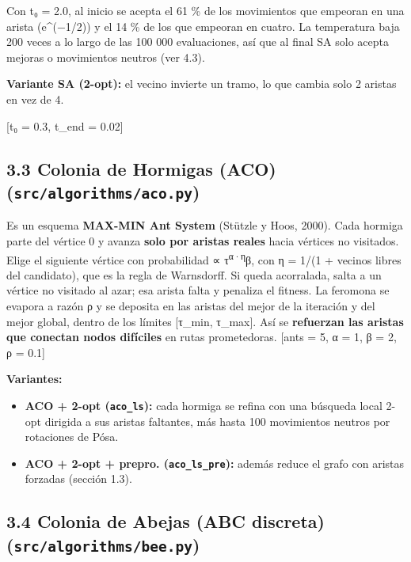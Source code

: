 \documentclass[
  spanish,
  11pt,
]{article}
\providecommand{\tightlist}{%
  \setlength{\itemsep}{0pt}\setlength{\parskip}{0pt}}
\begin{document}
Con t₀ = 2.0, al inicio se acepta el 61 \% de los movimientos que
empeoran en una arista (e\^{}(−1/2)) y el 14 \% de los que empeoran en
cuatro. La temperatura baja 200 veces a lo largo de las 100 000
evaluaciones, así que al final SA solo acepta mejoras o movimientos
neutros (ver 4.3).

\textbf{Variante SA (2-opt):} el vecino invierte un tramo, lo que cambia
solo 2 aristas en vez de 4.

{[}t₀ = 0.3, t\_end = 0.02{]}

\subsection{\texorpdfstring{3.3 Colonia de Hormigas (ACO)
(\texttt{src/algorithms/aco.py})}{3.3 Colonia de Hormigas (ACO) (src/algorithms/aco.py)}}\label{colonia-de-hormigas-aco-srcalgorithmsaco.py}

Es un esquema \textbf{MAX-MIN Ant System} (Stützle y Hoos, 2000). Cada
hormiga parte del vértice 0 y avanza \textbf{solo por aristas reales}
hacia vértices no visitados. Elige el siguiente vértice con probabilidad
∝ τ\textsuperscript{α·η}β, con η = 1/(1 + vecinos libres del candidato),
que es la regla de Warnsdorff. Si queda acorralada, salta a un vértice
no visitado al azar; esa arista falta y penaliza el fitness. La feromona
se evapora a razón ρ y se deposita en las aristas del mejor de la
iteración y del mejor global, dentro de los límites {[}τ\_min,
τ\_max{]}. Así se \textbf{refuerzan las aristas que conectan nodos
difíciles} en rutas prometedoras. {[}ants = 5, α = 1, β = 2, ρ = 0.1{]}

\textbf{Variantes:}

\begin{itemize}
\tightlist
\item
  \textbf{ACO + 2-opt (\texttt{aco\_ls}):} cada hormiga se refina con
  una búsqueda local 2-opt dirigida a sus aristas faltantes, más hasta
  100 movimientos neutros por rotaciones de Pósa.
\item
  \textbf{ACO + 2-opt + prepro. (\texttt{aco\_ls\_pre}):} además reduce
  el grafo con aristas forzadas (sección 1.3).
\end{itemize}

\subsection{\texorpdfstring{3.4 Colonia de Abejas (ABC discreta)
(\texttt{src/algorithms/bee.py})}{3.4 Colonia de Abejas (ABC discreta) (src/algorithms/bee.py)}}\label{colonia-de-abejas-abc-discreta-srcalgorithmsbee.py}
\end{document}
